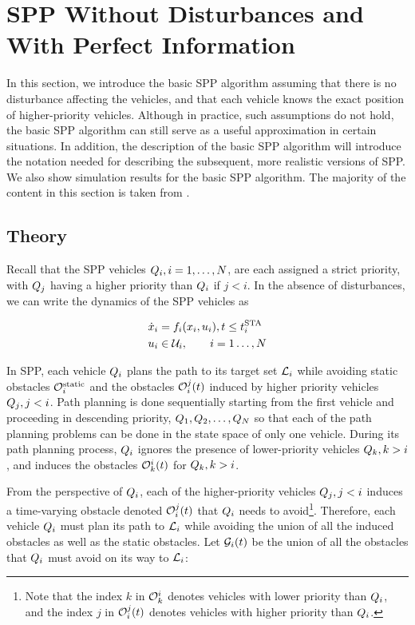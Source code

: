 \section{SPP Without Disturbances and With Perfect Information\label{sec:basic}}
In this section, we introduce the basic SPP algorithm assuming that there is no disturbance affecting the vehicles, and that each vehicle knows the exact position of higher-priority vehicles. Although in practice, such assumptions do not hold, the basic SPP algorithm can still serve as a useful approximation in certain situations. In addition, the description of the basic SPP algorithm will introduce the notation needed for describing the subsequent, more realistic versions of SPP. We also show simulation results for the basic SPP algorithm. The majority of the content in this section is taken from \cite{Chen15}.

\subsection{Theory}
Recall that the SPP vehicles $Q_i, i=1,\ldots,N$, are each assigned a strict priority, with $Q_j$ having a higher priority than $Q_i$ if $j<i$. In the absence of disturbances, we can write the dynamics of the SPP vehicles as

\begin{equation}
\label{eq:dyn_no_dstb}
\begin{aligned}
\dot\state_i &= \fdyn_i(\state_i, \ctrl_i), t \le \sta_i \\
\ctrl_i &\in \cset_i, \qquad i = 1 \ldots, \N
\end{aligned}
\end{equation}


In SPP, each vehicle $Q_i$ plans the path to its target set $\mathcal{L}_i$ while avoiding static obstacles $\mathcal{O}^\text{static}_i$ and the obstacles $\mathcal{O}_i^j(t)$ induced by higher priority vehicles $Q_j, j<i$. Path planning is done sequentially starting from the first vehicle and proceeding in descending priority, $Q_1, Q_2, \ldots, Q_{N}$ so that each of the path planning problems can be done in the state space of only one vehicle. During its path planning process, $Q_i$ ignores the presence of lower-priority vehicles $Q_k, k>i$, and induces the obstacles $\mathcal{O}_k^i(t)$ for $Q_k, k>i$.

From the perspective of $Q_i$, each of the higher-priority vehicles $Q_j, j<i$ induces a time-varying obstacle denoted $\mathcal{O}_i^j(t)$ that $Q_i$ needs to avoid\footnote{Note that the index $k$ in $\mathcal{O}_k^i$ denotes vehicles with lower priority than $Q_i$, and the index $j$ in $\mathcal{O}_i^j(t)$ denotes vehicles with higher priority than $Q_i$.}. Therefore, each vehicle $Q_i$ must plan its path to $\mathcal{L}_i$ while avoiding the union of all the induced obstacles as well as the static obstacles. Let $\mathcal{G}_i(t)$ be the union of all the obstacles that $Q_i$ must avoid on its way to $\mathcal{L}_i$:

